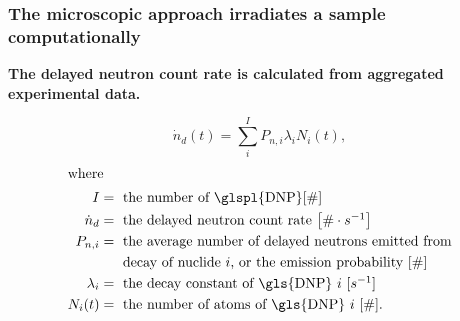 \begin{frame}
  \frametitle{The microscopic approach irradiates a sample computationally}
  \textbf{The delayed neutron count rate is calculated from aggregated experimental data.}

  \begin{equation}
    \dot{n}_{d}(t) = \sum_{i}^{I} P_{n, i} \lambda_i N_i(t),
    \label{eq:dnpsingleeq}
  \end{equation}
  \begin{align}
    \intertext{where}
    I &= \text{ the number of \glspl{DNP} [$\#$]} \nonumber \\
    \dot{n}_{d} &= \mbox{ the delayed neutron count rate $\left[\# \cdot s^{-1}\right]$} \nonumber \\
    P_{n, i} &= \mbox{ the average number of delayed neutrons emitted from} \nonumber\\
    & \;\;\;\;\;\; \mbox{decay of nuclide $i$, or the emission probability [$\#$]} \nonumber \\
    \lambda_i &= \mbox{ the decay constant of \gls{DNP} $i$ $[s^{-1}]$} \nonumber \\
    N_i(t) &= \mbox{ the number of atoms of \gls{DNP} $i$ $\left[\#\right]$.} \nonumber
  \end{align}
\end{frame}